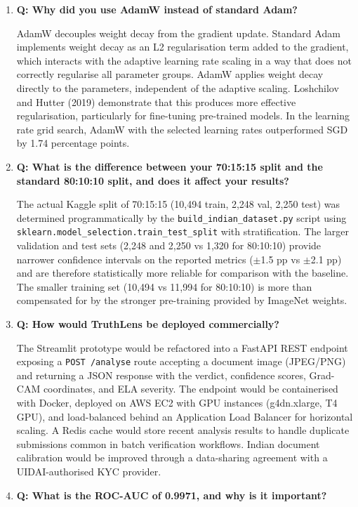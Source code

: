 \documentclass[12pt,a4paper,oneside]{report}
\begin{document}
\begin{enumerate}[leftmargin=*, wide]
\item \textbf{Q: Why did you use AdamW instead of standard Adam?}

AdamW decouples weight decay from the gradient update. Standard Adam implements
weight decay as an L2 regularisation term added to the gradient, which interacts
with the adaptive learning rate scaling in a way that does not correctly regularise
all parameter groups. AdamW applies weight decay directly to the parameters,
independent of the adaptive scaling. Loshchilov and Hutter (2019) demonstrate that
this produces more effective regularisation, particularly for fine-tuning
pre-trained models. In the learning rate grid search, AdamW with the selected
learning rates outperformed SGD by 1.74 percentage points.

\item \textbf{Q: What is the difference between your 70:15:15 split and the
standard 80:10:10 split, and does it affect your results?}

The actual Kaggle split of 70:15:15 (10,494 train, 2,248 val, 2,250 test)
was determined programmatically by the \texttt{build\_indian\_dataset.py} script
using \texttt{sklearn.model\_selection.train\_test\_split} with stratification.
The larger validation and test sets (2,248 and 2,250 vs 1,320 for 80:10:10)
provide narrower confidence intervals on the reported metrics ($\pm$1.5 pp vs
$\pm$2.1 pp) and are therefore statistically more reliable for comparison with
the baseline. The smaller training set (10,494 vs 11,994 for 80:10:10) is
more than compensated for by the stronger pre-training provided by ImageNet
weights.

\item \textbf{Q: How would TruthLens be deployed commercially?}

The Streamlit prototype would be refactored into a FastAPI REST endpoint exposing
a \texttt{POST /analyse} route accepting a document image (JPEG/PNG) and returning
a JSON response with the verdict, confidence scores, Grad-CAM coordinates, and
ELA severity. The endpoint would be containerised with Docker, deployed on AWS
EC2 with GPU instances (g4dn.xlarge, T4 GPU), and load-balanced behind an
Application Load Balancer for horizontal scaling. A Redis cache would store
recent analysis results to handle duplicate submissions common in batch
verification workflows. Indian document calibration would be improved through
a data-sharing agreement with a UIDAI-authorised KYC provider.

\item \textbf{Q: What is the ROC-AUC of 0.9971, and why is it important?}


\end{enumerate}
\end{document}
